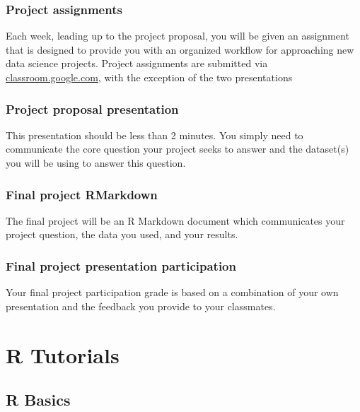 \documentclass[]{book}
\theoremstyle{definition}
\theoremstyle{definition}
\theoremstyle{remark}
\begin{document}
\section*{Project assignments}\label{project-assignments}

Each week, leading up to the project proposal, you will be given an
assignment that is designed to provide you with an organized workflow
for approaching new data science projects. Project assignments are
submitted via \href{https//classroom.google.com}{classroom.google.com},
with the exception of the two presentations

\section*{Project proposal
presentation}\label{project-proposal-presentation}

This presentation should be less than 2 minutes. You simply need to
communicate the core question your project seeks to answer and the
dataset(s) you will be using to answer this question.

\section*{Final project RMarkdown}\label{final-project-rmarkdown}

The final project will be an R Markdown document which communicates your
project question, the data you used, and your results.

\section*{Final project presentation
participation}\label{final-project-presentation-participation}

Your final project participation grade is based on a combination of your
own presentation and the feedback you provide to your classmates.

\part{R Tutorials}\label{part-r-tutorials}

\hypertarget{intro}{\chapter{R Basics}\label{intro}}
\end{document}

